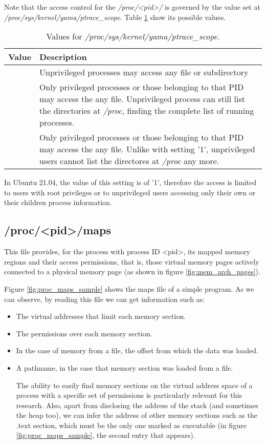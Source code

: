 Note that the access control for the \textit{/proc/<pid>/} is governed by the value set at \textit{/proc/sys/kernel/yama/ptrace\_scope}. Table \ref{table:yama_values} show its possible values.

\begin{table}[htbp]
\begin{tabular}{|>{\centering\arraybackslash}p{3cm}|>{\centering\arraybackslash}p{11cm}|}
\hline
Value & Description\\
\hline
\hline
0 & Unprivileged processes may access any file or subdirectory\\
\hline
1 & Only privileged processes or those belonging to that PID may access the any file. Unprivileged process can still list the directories at \textit{/proc}, finding the complete list of running processes.\\
\hline
2 & Only privileged processes or those belonging to that PID may access the any file. Unlike with setting '1', unprivileged users cannot list the directores at \textit{/proc} any more.\\ 
\hline
\end{tabular}
\caption{Values for \textit{/proc/sys/kernel/yama/ptrace\_scope}.}
\label{table:yama_values}
\end{table}

In Ubuntu 21.04, the value of this setting is of '1', therefore the access is limited to users with root privileges or to unprivileged users accessing only their own or their children process information.

\subsection{/proc/<pid>/maps} \label{subsection:proc_maps}
This file provides, for the process with process ID <pid>, its mapped memory regions and their access permissions, that is, those virtual memory pages actively connected to a physical memory page (as shown in figure \ref{fig:mem_arch_pages}).

Figure \ref{fig:proc_maps_sample} shows the maps file of a simple program. As we can observe, by reading this file we can get information such as:
\begin{itemize}
\item The virtual addresses that limit each memory section.
\item The permissions over each memory section.
\item In the case of memory from a file, the offset from which the data was loaded.
\item A pathname, in the case that memory section was loaded from a file.

The ability to easily find memory sections on the virtual address space of a process with a specific set of permissions is particularly relevant for this research. Also, apart from disclosing the address of the stack (and sometimes the heap too), we can infer the address of other memory sections such as the .text section, which must be the only one marked as executable (in figure \ref{fig:proc_maps_sample}, the second entry that appears).

\end{itemize}

